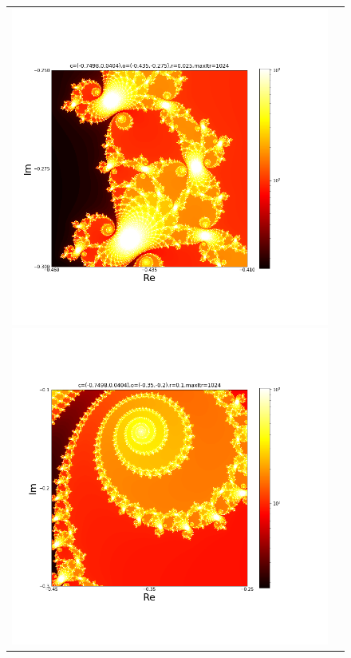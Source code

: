 \documentclass[uplatex,a4paper,11pt,oneside,openany]{jsbook}
\begin{document}
\begin{figure}[H]
  \centering
  \begin{tabular}{cc}
      \begin{minipage}{0.5\hsize}
      \centering
\includegraphics[bb=25 100 650 600,keepaspectratio,clip,scale=0.35]{../src/figure/julia006.png}
      \end{minipage}
      \begin{minipage}{0.5\hsize}
      \centering
\includegraphics[bb=35 100 650 600,keepaspectratio,clip,scale=0.35]{../src/figure/julia005.png}
      \end{minipage}
    \end{tabular}
\end{figure}%
\end{document}
